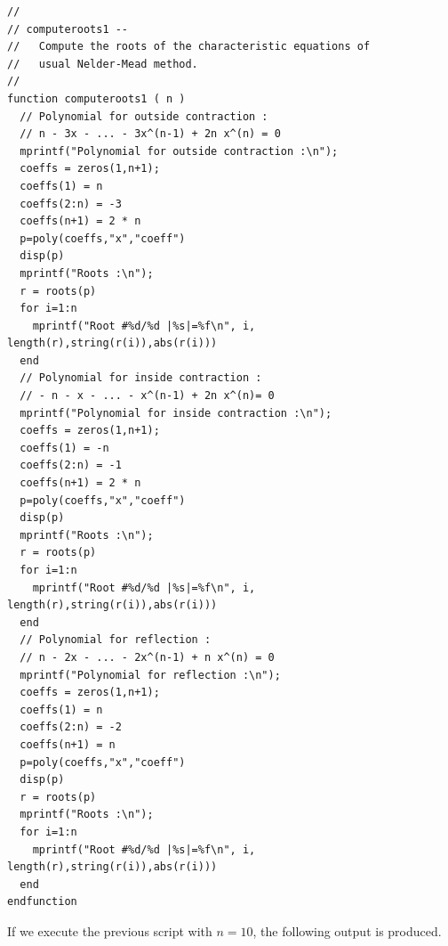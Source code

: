 \lstset{language=scilabscript}
\begin{lstlisting}
//
// computeroots1 --
//   Compute the roots of the characteristic equations of 
//   usual Nelder-Mead method.
//
function computeroots1 ( n )
  // Polynomial for outside contraction :
  // n - 3x - ... - 3x^(n-1) + 2n x^(n) = 0
  mprintf("Polynomial for outside contraction :\n");
  coeffs = zeros(1,n+1);
  coeffs(1) = n
  coeffs(2:n) = -3
  coeffs(n+1) = 2 * n
  p=poly(coeffs,"x","coeff")
  disp(p)
  mprintf("Roots :\n");
  r = roots(p)
  for i=1:n
    mprintf("Root #%d/%d |%s|=%f\n", i, length(r),string(r(i)),abs(r(i)))
  end
  // Polynomial for inside contraction :
  // - n - x - ... - x^(n-1) + 2n x^(n)= 0
  mprintf("Polynomial for inside contraction :\n");
  coeffs = zeros(1,n+1);
  coeffs(1) = -n
  coeffs(2:n) = -1
  coeffs(n+1) = 2 * n
  p=poly(coeffs,"x","coeff")
  disp(p)
  mprintf("Roots :\n");
  r = roots(p)
  for i=1:n
    mprintf("Root #%d/%d |%s|=%f\n", i, length(r),string(r(i)),abs(r(i)))
  end
  // Polynomial for reflection :
  // n - 2x - ... - 2x^(n-1) + n x^(n) = 0
  mprintf("Polynomial for reflection :\n");
  coeffs = zeros(1,n+1);
  coeffs(1) = n
  coeffs(2:n) = -2
  coeffs(n+1) = n
  p=poly(coeffs,"x","coeff")
  disp(p)
  r = roots(p)
  mprintf("Roots :\n");
  for i=1:n
    mprintf("Root #%d/%d |%s|=%f\n", i, length(r),string(r(i)),abs(r(i)))
  end
endfunction
\end{lstlisting}

If we execute the previous script with $n=10$, the following 
output is produced.

